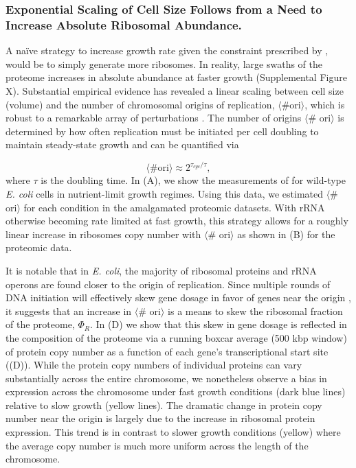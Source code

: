 \subsubsection{Exponential Scaling of Cell Size
Follows from a Need to Increase Absolute Ribosomal Abundance.}
A na\"ive strategy to increase growth rate given the constraint
prescribed by , would be to simply generate more ribosomes. In
reality, large swaths of the proteome increases in absolute abundance at faster growth
(Supplemental Figure X). Substantial empirical evidence has revealed
a linear scaling between cell size (volume) and the number of chromosomal
origins of replication, $\langle\text{\# ori}\rangle$, which is robust to a
remarkable array of perturbations \citep{si2017}. The number of origins
$\langle$\# ori$\rangle$ is determined by how often replication must be
initiated per cell doubling to maintain steady-state growth and can be
quantified via

\begin{equation}
    \langle \text{\# ori} \rangle \approx 2^{\tau_{cyc} / \tau},
\end{equation}
where $\tau$ is the doubling time. In (A), we
show the measurements of \cite{si2017} for wild-type \textit{E. coli} cells
in nutrient-limit growth regimes. Using this data, we estimated $\langle$\#
ori$\rangle$ for each condition in the amalgamated proteomic datasets. With
rRNA otherwise becoming rate limited at fast growth, this strategy allows for
a roughly linear increase in ribosomes copy number with $\langle$\#
ori$\rangle$ as shown in (B) for the proteomic
data.

It is notable that in \textit{E. coli}, the majority of ribosomal proteins and rRNA operons are found
closer to the origin of replication. Since multiple rounds of DNA initiation will effectively
skew gene dosage in favor of genes near the origin \citep{scholz2019}, it suggests
that an increase in  $\langle$\# ori$\rangle$ is a means to skew the ribosomal
fraction of the proteome, $\Phi_R$. In (D) we show
that this skew in gene dosage is reflected in the composition of the proteome
via a running boxcar average (500 kbp window) of protein copy number as a function
of each gene's transcriptional start site ((D)).
While the protein copy numbers of individual proteins can vary substantially
across the entire chromosome, we nonetheless observe a bias in expression across
the chromosome under fast growth conditions (dark blue lines) relative to slow
growth (yellow lines). The dramatic
change in protein copy number near the origin is largely due to the increase
in ribosomal protein expression. This trend is in contrast to slower growth
conditions (yellow) where the average copy number is much more uniform across
the length of the chromosome.

